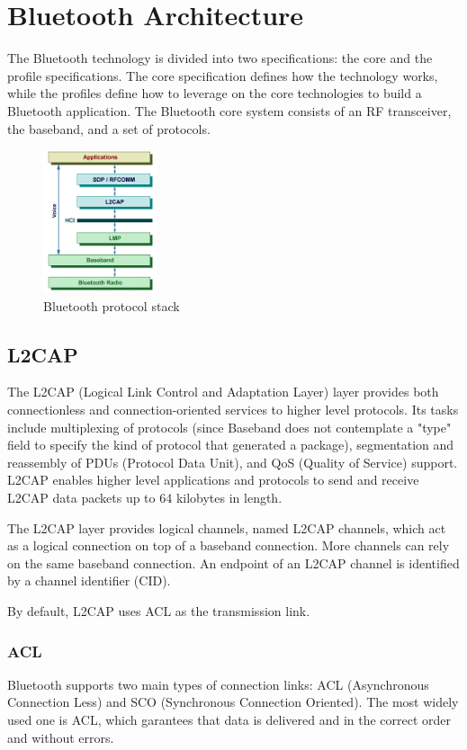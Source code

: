 \section{Bluetooth Architecture}
The Bluetooth technology is divided into two specifications: the core and the profile specifications. The core specification defines how the technology works, while the profiles define how to leverage on the core technologies to build a Bluetooth application.
The Bluetooth core system consists of an RF transceiver, the baseband, and a set of protocols.

\begin{figure}[ht!]
  \centering
  \includegraphics[width=0.3\textwidth]{img/bluetooth_protocol_stack.png} 
  \caption{Bluetooth protocol stack}
  \label{img:bt-protocol-stack}
\end{figure}

\subsection{L2CAP}
The L2CAP (Logical Link Control and Adaptation Layer) layer provides both connectionless and connection-oriented services to higher level protocols. Its tasks include multiplexing of protocols (since Baseband does not contemplate a "type" field to specify the kind of protocol that generated a package), segmentation and reassembly of PDUs (Protocol Data Unit), and QoS (Quality of Service) support.
L2CAP enables higher level applications and protocols to send and receive L2CAP data packets up to 64 kilobytes in length.

The L2CAP layer provides logical channels, named L2CAP channels, which act as a logical connection on top of a baseband connection.
More channels can rely on the same baseband connection.
An endpoint of an L2CAP channel is identified by a channel identifier (CID).

By default, L2CAP uses ACL as the transmission link.

\subsubsection{ACL}
Bluetooth supports two main types of connection links: ACL (Asynchronous Connection Less) and SCO (Synchronous Connection Oriented).
The most widely used one is ACL, which garantees that data is delivered and in the correct order and without errors.

